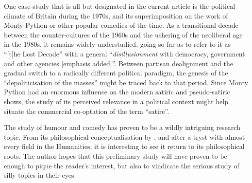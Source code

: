 \documentclass[
,a4paper
,DIV=12
,12pt
,abstract
,bibliography=totoc
]{scrartcl}
\begin{document}
One case-study that is all but designated in the current article is the political climate of Britain during the 1970s, and its superimposition on the work of Monty Python or other popular comedies of the time.  As a transitional decade between the counter-cultures of the 1960s and the ushering of the neoliberal age in the 1980s, it remains widely understudied, \textcite{forster2010} going so far as to refer to it as \enquote{[t]he Lost Decade} with a general \enquote{\emph{disillusionment} with democracy, government and other agencies [emphasis added]}.  Between partisan dealignment and the gradual switch to a radically different political paradigm, the genesis of the \enquote{depoliticisation of the masses} might be traced back to that period.  Since Monty Python had an enormous influence on the modern satiric and pseudo-satiric shows, the study of its perceived relevance in a political context might help situate the commercial co-optation of the term \enquote{satire}.

The study of humour and comedy has proven to be a wildly intriguing research topic.  From its philosophical conceptualisation by \textcite{bergson1900}, and after a tryst with almost every field in the Humanities, it is interesting to see it return to its philosophical roots.  The author hopes that this preliminary study will have proven to be enough to pique the reader’s interest, but also to vindicate the serious study of silly topics in their eyes.

{
  \printbibliography%
}
\end{document}
